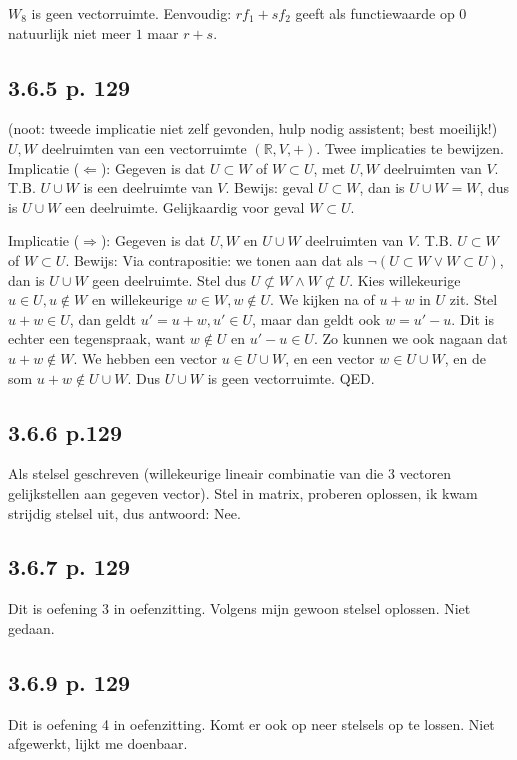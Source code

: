\documentclass{article}
\begin{document}
$W_8$ is geen vectorruimte. Eenvoudig: $rf_1 + sf_2$ geeft als functiewaarde op $0$ natuurlijk niet meer $1$ maar $r+s$. 

\subsection{3.6.5 p. 129} 
(noot: tweede implicatie niet zelf gevonden, hulp nodig assistent; best moeilijk!) 
$U, W$ deelruimten van een vectorruimte $(\mathbb{R},V,+)$. 
Twee implicaties te bewijzen. 
Implicatie ($\Leftarrow$): Gegeven is dat $U \subset W$ of $W \subset U$, met $U,W$ deelruimten van $V$.  T.B. $U \cup W$ is een deelruimte van $V$. 
Bewijs: geval $U \subset W$, dan is $U \cup W = W$, dus is $U \cup W$ een deelruimte. Gelijkaardig voor geval $W \subset U$. 

Implicatie ($\Rightarrow$): Gegeven is dat $U,W$ en $U \cup W$ deelruimten van $V$. T.B. $U \subset W$ of $W \subset U$. Bewijs: 
Via contrapositie: we tonen aan dat als $\neg(U \subset W \lor W \subset U)$, dan is $U \cup W$ geen deelruimte. Stel dus $U \not\subset W \land W \not\subset U$. Kies willekeurige $u \in U, u\not\in W$ en willekeurige $w \in W, w\not\in U$. We kijken na of $u+w$ in $U$ zit. Stel $u+w \in U$, dan geldt $u' = u+w, u' \in U$, maar dan geldt ook $w= u' - u$. Dit is echter een tegenspraak, want $w \not\in U$ en $u' - u \in U$. Zo kunnen we ook nagaan dat $u+w \not\in W$. We hebben een vector $u \in U \cup W$, en een vector $w \in U \cup W$, en de som $u+w \not\in U \cup W$. Dus $U \cup W$ is geen vectorruimte. QED. 


\subsection{3.6.6 p.129}
Als stelsel geschreven (willekeurige lineair combinatie van die 3 vectoren gelijkstellen aan gegeven vector). Stel in matrix, proberen oplossen, ik kwam strijdig stelsel uit, dus antwoord: Nee. 

\subsection{3.6.7 p. 129}
Dit is oefening 3 in oefenzitting. 
Volgens mijn gewoon stelsel oplossen. Niet gedaan. 

\subsection{3.6.9 p. 129 } 
Dit is oefening 4 in oefenzitting. 
Komt er ook op neer stelsels op te lossen. Niet afgewerkt, lijkt me doenbaar. 
\end{document}
